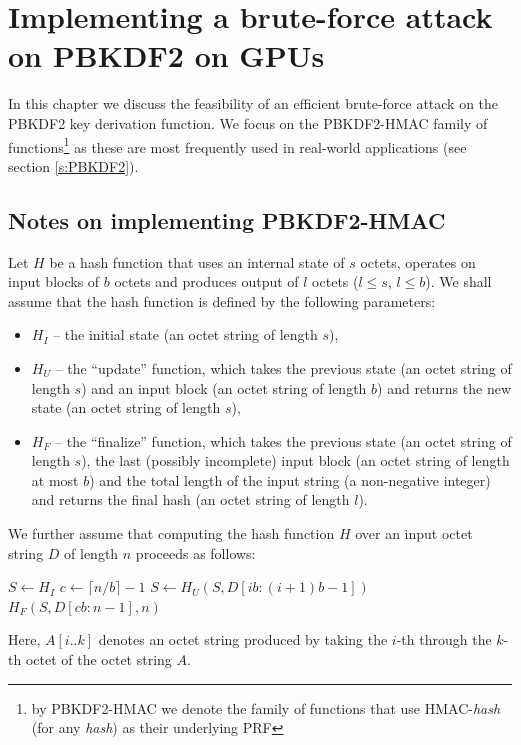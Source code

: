 \documentclass[12pt,oneside]{fithesis2}
\begin{document}
    \chapter{Implementing a brute-force attack on PBKDF2 on GPUs}
      In this chapter we discuss the feasibility of an efficient brute-force attack on the PBKDF2 key derivation function. We focus on the PBKDF2-HMAC family of functions\footnote{by PBKDF2-HMAC we denote the family of functions that use HMAC-\emph{hash} (for any \emph{hash}) as their underlying PRF} as these are most frequently used in real-world applications (see section \ref{s:PBKDF2}).
      
      \section{Notes on implementing PBKDF2-HMAC}
      Let $H$ be a hash function that uses an internal state of $s$ octets, operates on input blocks of $b$ octets and produces output of $l$ octets ($l \le s$, $l \le b$). We shall assume that the hash function is defined by the following parameters:
      \begin{itemize}
        \item $H_I$ -- the initial state (an octet string of length $s$),
        \item $H_U$ -- the ``update'' function, which takes the previous state (an octet string of length $s$) and an input block (an octet string of length $b$) and returns the new state (an octet string of length $s$),
        \item $H_F$ -- the ``finalize'' function, which takes the previous state (an octet string of length $s$), the last (possibly incomplete) input block (an octet string of length at most $b$) and the total length of the input string (a non-negative integer) and returns the final hash (an octet string of length $l$).
      \end{itemize}
      We further assume that computing the hash function $H$ over an input octet string $D$ of length $n$ proceeds as follows:
      \begin{algorithmic}[1]
          \State $S \gets H_I$
          \State $c \gets \lceil n / b \rceil - 1$
            \State $S \gets H_U(S, D[ib:(i+1)b-1])$
          \EndFor
          \State \Return $H_F(S, D[cb:n-1], n)$
        \EndFunction
      \end{algorithmic}
      
      Here, $A[i..k]$ denotes an octet string produced by taking the $i$-th through the $k$-th octet of the octet string $A$.
      
\end{document}
